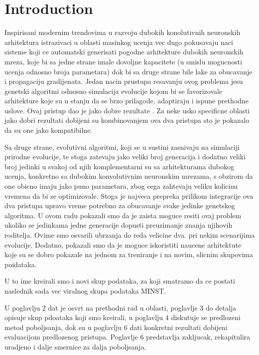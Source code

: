 \documentclass[eng]{simposium}
\begin{document}
\section{Introduction}

Inspirisani modernim trendovima u razvoju dubokih konolutivnih neuronskih arhitektura \cite{28}\cite{29} istrazivaci u 
oblasti masinkog ucenja vec dugo pokusavaju naci sisteme koji ce automatski generisati pogodne arhitekture dubokih 
neuronskih mreza, koje bi sa jedne strane imale dovoljne kapacitete (u smislu mogucnosti ucenja odnosno broja parametara) dok 
bi sa druge strane bile lake za obucavanje i propagaciju gradijenata. Jedan nacin prustupa resavanju ovog problema jesu genetski 
algoritmi odnosno simulacija evolucije kojom bi se favorizovale arhitekture koje su u stanju da se brzo prilagode, adaptiraju 
i ispune prethodne uslove. Ovaj pristup dao je jako dobre rezultate \cite{5}\cite{30}\cite{31}. Za neke usko specificne oblasti 
jako dobri rezultati dobijeni su kombinovanjem ova dva pristupa \cite{32}\cite{33} sto je pokazalo da su one jako kompatibilne. 

Sa druge strane, evolutivni algoritmi, koji se u sustini zasnivaju na simulaciji prirodne evolucije, te stoga zatevaju jako 
veliki broj generacija i dodatno veliki broj jedinki u svakoj od njih komplementarni su sa arhitekturama dubokog ucenja, konkretno 
sa dubokim konvolutivnim neuronskim mrezama, s obzirom da one obicno imaju jako puno parametara, zbog cega zahtevaju veliku 
kolicinu vremena da bi se optimizovale. Stoga je najveca prepreka prilikom integracije ova dva pristupa upravo vreme potrebno 
za obucavanje svake jedinke genetskog algoritma. U ovom radu pokazali smo da je zaista moguce resiti ovaj problem ukoliko se 
jedinkama jedne generacije dopusti preuzimanje znanja njihovih roditelja. Ovime smo osvarili ubrzanja do reda velicine dva. pri 
nekim scenarijima evolucije. Dodatno, pokazali smo da je moguce iskoristiti naucene arhitektute koje su se dobro pokazale na jednom 
za treniranje i na novim, slicnim skupovima poidataka.

U to ime kreirali smo i novi skup podataka, za koji smatramo da ce postati naslednik sada vec viralnog skupa podataka MINST.

U poglavlju 2 dat je osvrt na prethodni rad u oblasti, poglavlje 3 do detalja opisuje skup pdoataka koji smo kreirali, 
u poglavlju 4 diskutuje se predlozeni metod poboljsanja, dok su u poglavlju 6 dati konkretni rezultati dobijeni evaluacijom 
predlozenog pristupa. Poglavlje 6 predstavlja zakljucak, rekapitulira uradjeno i dalje smernice za dalja poboljsanja. 
\end{document}
